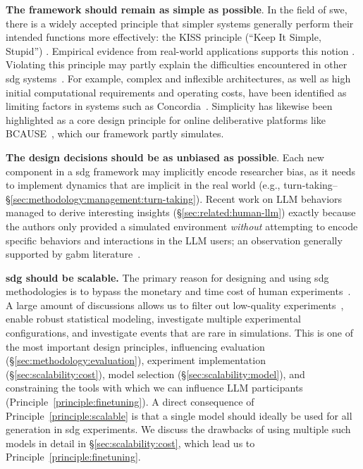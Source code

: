 \begin{principle}[Simplicity]
	\label{principle:simple}
	\textbf{The framework should remain as simple as possible}. In the field of \ac{swe}, there is a widely accepted principle that simpler systems generally perform their intended functions more effectively: the KISS principle (``Keep It Simple, Stupid'') \cite{beck2000extreme,thomas2025simplicity}. Empirical evidence from real-world applications supports this notion \cite{banker1989software,ogheneovo2014relationship}. Violating this principle may partly explain the difficulties encountered in other \ac{sdg} systems~\cite{balog_2024}. For example, complex and inflexible architectures, as well as high initial computational requirements and operating costs, have been identified as limiting factors in systems such as Concordia~\cite{neurips_concordia}. Simplicity has likewise been highlighted as a core design principle for online deliberative platforms like BCAUSE~\cite{bcause2023}, which our framework partly simulates.
\end{principle}

\begin{principle}
	\label{principle:bias}
	\textbf{The design decisions should be as unbiased as possible}. Each new component in a \ac{sdg} framework may implicitly encode researcher bias, as it needs to implement dynamics that are implicit in the real world (e.g., turn-taking--\S\ref{sec:methodology:management:turn-taking}). Recent work on LLM behaviors~\cite{park_2023_game} managed to derive interesting insights (\S\ref{sec:related:human-llm}) exactly because the authors only provided a simulated environment \emph{without} attempting to encode specific behaviors and interactions in the LLM users; an observation generally supported by \ac{gabm} literature~\cite{adornetto2025_gabms}.
\end{principle}

\begin{principle}[Scalability]
	\label{principle:scalable}
	\textbf{\ac{sdg} should be scalable.} The primary reason for designing and using \ac{sdg} methodologies is to bypass the monetary and time cost of human experiments~\cite{rossi_2024}. A large amount of discussions allows us to filter out low-quality experiments~\cite{ulmer2024}, enable robust statistical modeling, investigate multiple experimental configurations, and investigate events that are rare in simulations. This is one of the most important design principles, influencing evaluation (\S\ref{sec:methodology:evaluation}), experiment implementation (\S\ref{sec:scalability:cost}), model selection (\S\ref{sec:scalability:model}), and constraining the tools with which we can influence LLM participants (Principle~\ref{principle:finetuning}). A direct consequence of Principle~\ref{principle:scalable} is that a single model should ideally be used for all generation in \ac{sdg} experiments. We discuss the drawbacks of using multiple such models in detail in \S\ref{sec:scalability:cost}, which lead us to Principle~\ref{principle:finetuning}.
\end{principle}

